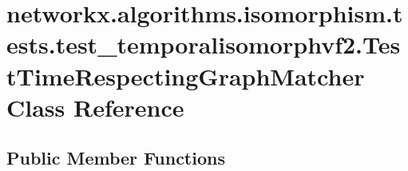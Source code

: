 \hypertarget{classnetworkx_1_1algorithms_1_1isomorphism_1_1tests_1_1test__temporalisomorphvf2_1_1TestTimeRespectingGraphMatcher}{}\section{networkx.\+algorithms.\+isomorphism.\+tests.\+test\+\_\+temporalisomorphvf2.\+Test\+Time\+Respecting\+Graph\+Matcher Class Reference}
\label{classnetworkx_1_1algorithms_1_1isomorphism_1_1tests_1_1test__temporalisomorphvf2_1_1TestTimeRespectingGraphMatcher}
\subsection*{Public Member Functions}
